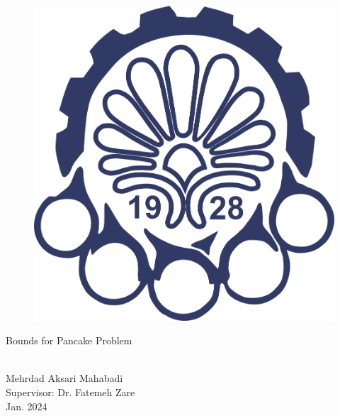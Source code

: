 \begin{figure}[t]
		\centering
		\includegraphics[width=0.2\linewidth]{assets/logo.png}
\end{figure}
\begin{center}
\begin{huge}
    Bounds for Pancake Problem
\end{huge}\\[0.2in]
Mehrdad Aksari Mahabadi\\ 
Supervisor: Dr. Fatemeh Zare \\
Jan. 2024
\end{center}